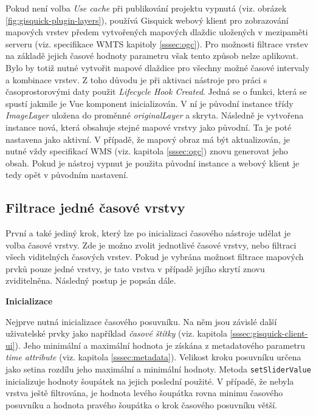 Pokud není volba \textit{Use cache} při publikování projektu vypnutá
(viz. obrázek \ref{fig:gisquick-plugin-layers}), používá Gisquick webový
klient pro zobrazování mapových vrstev předem vytvořených mapových
dlaždic uložených v mezipaměti serveru (viz. specifikace WMTS kapitoly \ref{sssec:ogc}). Pro možnosti filtrace vrstev
na základě jejich časové hodnoty parametru však tento způsob nelze
aplikovat. Bylo by totiž nutné vytvořit mapové dlaždice pro všechny
možné časové intervaly a kombinace vrstev. Z toho důvodu je při aktivaci
nástroje pro práci s časoprostorovými daty použit \textit{Lifecycle Hook
Created}. Jedná se o funkci, která se spustí jakmile je Vue komponent
inicializován. V ní je původní instance třídy \textit{ImageLayer}
uložena do proměnné \textit{originalLayer} a skryta. Následně je
vytvořena instance nová, která obsahuje stejné mapové vrstvy jako
původní. Ta je poté nastavena jako aktivní. V případě, že mapový obraz má být aktualizován, je nutné vždy specifikací WMS (viz. kapitola \ref{sssec:ogc}) znovu generovat jeho obsah. Pokud je nástroj vypnut
je použita původní instance a webový klient je tedy opět v původním
nastavení.

\subsection{Filtrace jedné časové vrstvy}
\label{sssec:one-layer-filtration}

První a také jediný krok, který lze po inicializaci časového nástroje
udělat je volba časové vrstvy. Zde je možno zvolit jednotlivé časové
vrstvy, nebo filtraci všech viditelných časových vrstev. Pokud je
vybrána možnost filtrace mapových prvků pouze jedné vrstvy, je tato
vrstva v případě jejího skrytí znovu zviditelněna. Následný postup
je popsán dále.

\bigskip
\noindent \textbf{Inicializace}

Nejprve nutná inicializace časového posuvníku. Na něm jsou závislé
další uživatelské prvky jako například \textit{časové štítky}
(viz. kapitola \ref{sssec:gisquick-client-ui}). Jeho minimální a maximální
hodnota je získána z metadatového parametru \textit{time\textunderscore
attribute} (viz. kapitola \ref{sssec:metadata}). Velikost kroku posuvníku
určena jako setina rozdílu jeho maximální a minimální hodnoty. Metoda
\verb|setSliderValue| inicializuje hodnoty šoupátek na jejich poslední
použité. V případě, že nebyla vrstva ještě filtrována, je hodnota
levého šoupátka rovna minimu časového posuvníku a hodnota pravého
šoupátka o krok časového posuvníku větší.


